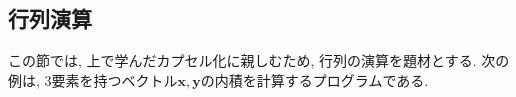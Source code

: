 \begin{comment}
以下は二次方程式の判別式を計算して, それが正, 零, 負であるときにそれぞれ異なる処理をするプログラムである.


\subsection*{$<$演習課題$>$}
二次方程式の判別式を計算し, それが正のときは二実数解,
零のときは重解, 負のときは複素数解を計算するプログラムを作成せよ.


\subsection*{$<$演習課題$>$}
自然対数の底$e$の近似値を以下に示す二つの数列を用いて計算せよ.
$n=1, 2, \cdots$と大きくしていき, 真値へと漸近する様子を確認せよ.
また, 真値との相対誤差が$10^{-10}$以下になったときにプログラムを停止するようにせよ.
\begin{equation}
a_n= \Big( 1+\frac{1}{n}\Big)^n
\end{equation}
\begin{equation}
b_n=\sum_{m=0}^{n}\frac{1}{m!}
\end{equation}

以下に, ソースコードの一部をヒントとして示す. 必要であれば参考にして良い. 


\end{comment}


\subsection{行列演算}


この節では, 上で学んだカプセル化に親しむため, 行列の演算を題材とする. 
次の例は, 3要素を持つベクトル$\bm{x}, \bm{y}$の内積を計算するプログラムである. 

